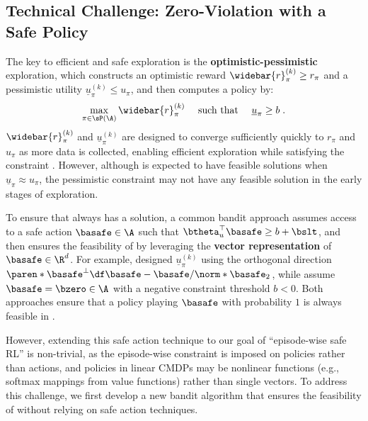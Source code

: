 \subsection{Technical Challenge: Zero-Violation with a Safe Policy}\label{subsec:bandit-challenge}

The key to efficient and safe exploration is the \textbf{optimistic-pessimistic} exploration, which constructs an optimistic reward $\widebar{r}^{(k)}_\pi \geq r_\pi$ and a pessimistic utility $\underline{u}^{(k)}_\pi \leq u_\pi$, and then computes a policy by:
\begin{align}\label{eq:optimistic-pessimistic-bandit}
\max_{\pi \in \sP(\A)} 
\widebar{r}^{(k)}_\pi
\quad \text{ such that }\quad \underline{u}_\pi \geq b\;.
\end{align}
$\widebar{r}^{(k)}_\pi$ and $\underline{u}^{(k)}_\pi$ are designed to converge sufficiently quickly to $r_\pi$ and $u_\pi$ as more data is collected, enabling efficient exploration while satisfying the constraint \citep{abbasi2011improved}.
However, although  is expected to have feasible solutions when $\underline{u}_\pi \approx u_\pi$, the pessimistic constraint may not have any feasible solution in the early stages of exploration.

To ensure that  always has a solution, a common bandit approach assumes access to a safe action $\basafe \in \A$ such that $\btheta_u^\top \basafe \geq b + \bslt$, and then ensures the feasibility of  by leveraging the \textbf{vector representation} of $\basafe \in \R^d$. 
For example, \citet{pacchiano2021stochastic,pacchiano2024contextual,amani2019linear} designed $\underline{u}^{(k)}_\pi$ using the orthogonal direction $\paren*{\basafe}^\bot \df \basafe - \basafe / \norm*{\basafe}_2$, while \citet{hutchinson2024directional} assume $\basafe = \bzero \in \A$ with a negative constraint threshold $b < 0$. 
Both approaches ensure that a policy playing $\basafe$ with probability $1$ is always feasible in .

However, extending this safe action technique to our goal of ``episode-wise safe RL'' is non-trivial, as the episode-wise constraint is imposed on policies rather than actions, and policies in linear CMDPs may be nonlinear functions (e.g., softmax mappings from value functions) rather than single vectors.
To address this challenge, we first develop a new bandit algorithm that ensures the feasibility of  without relying on safe action techniques.



